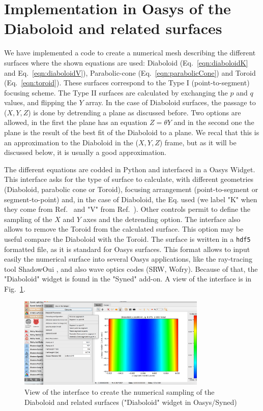 \documentclass[a4paper, 11pt]{article}
\begin{document}
\section{Implementation in Oasys of the Diaboloid and related surfaces}

We have implemented a code to create a numerical mesh describing the different surfaces where the shown equations are used: Diaboloid (Eq.~\ref{eqn:diaboloidK} and Eq.~\ref{eqn:diaboloidV}), Parabolic-cone (Eq.~\ref{eqn:parabolicCone}) and Toroid (Eq.~\ref{eqn:toroid}). These surfaces correspond to the Type I (point-to-segment) focusing scheme. The Type II surfaces are calculated by exchanging the $p$ and $q$ values, and flipping the $Y$ array. In the case of Diaboloid surfaces, the passage to ($X,Y,Z$) is done by detrending a plane as discussed before. Two options are allowed, in the first the plane has an equation $Z=\theta Y$ and in the second one the plane is the result of the best fit of the Diaboloid to a plane. We recal that this is an approximation to the Diaboloid in the ($X,Y,Z$) frame, but as it will be discussed below, it is usually a good approximation.

The different equations are codded in Python and interfaced in a Oasys Widget. This interface asks for the type of surface to calculate, with different geometries (Diaboloid, parabolic cone or Toroid), focusing arrangement (point-to-segment or segment-to-point) and, in the case of Diaboloid, the Eq. used (we label "K" when they come from Ref.~\cite{Goldberg2020} and "V" from Ref.~\cite{Valeriy2020b}). Other controls permit to define the sampling of the $X$ and $Y$ axes and the detrending option. The interface also allows to remove the Toroid from the calculated surface. This option may be useful compare the Diaboloid with the Toroid. The surface is written in a {\tt hdf5} formatted file, as it is standard for Oasys surfaces. This format allows to input easily the numerical surface into several Oasys applications, like the ray-tracing tool ShadowOui \cite{codeSHADOWOUI}, and also wave optics codes (SRW, Wofry). Because of that, the "Diaboloid" widget is found in the "Syned" add-on. A view of the interface is in Fig.~\ref{fig:widget}.

\begin{figure}
\centering
\includegraphics[width=0.8\textwidth]{figures/widget.png}
\caption{\label{fig:widget}View of the interface to create the numerical sampling of the Diaboloid and related surfaces ("Diaboloid" widget in Oasys/Syned) }
\end{figure}
\end{document}
